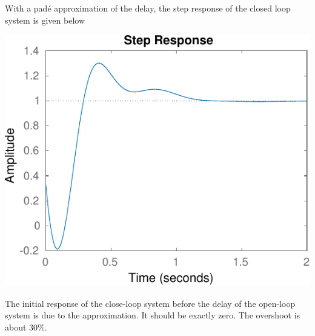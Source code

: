 \documentclass{scrartcl}
\begin{document}
    With a padé approximation of the delay, the step response of the closed loop system is given below
      \begin{center}
      \includegraphics[width=0.6\linewidth]{pid_step_pade-crop}
      \end{center}
    The initial response of the close-loop system before the delay of the open-loop system is due to the approximation. It should be exactly zero. The overshoot is about 30\%.
\end{document}
